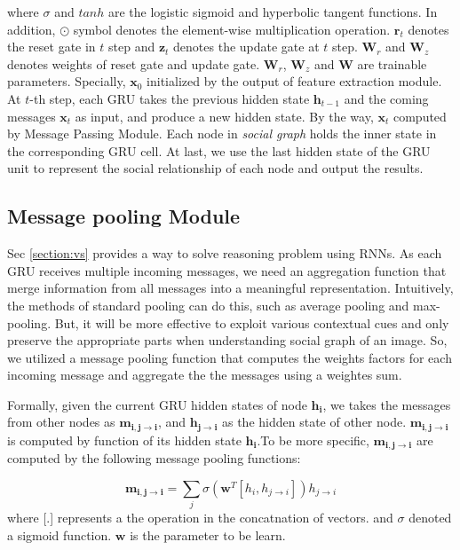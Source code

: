 \documentclass{article}
\begin{document}
where $\sigma$ and $tanh$ are the logistic sigmoid and hyperbolic tangent functions. In addition, $\odot$ symbol denotes the element-wise multiplication operation. $\bm{r}_t$ denotes the reset gate in $t$ step and $\bm{z}_t$ denotes the update gate at $t$ step. $\bm{W}_r$ and $\bm{W}_z$ denotes weights of reset gate and update gate. $\bm{W}_r$, $\bm{W}_z$ and $\bm{W}$ are trainable parameters. Specially, $\bm{x}_0$ initialized by the output of feature extraction module. At $t$-th step, each GRU takes the previous hidden state $\bm{h}_{t-1}$ and the coming messages $\bm{x}_{t}$ as input, and produce a new hidden state. By the way, $\bm{x}_t$ computed by Message Passing Module. Each node in \emph{social graph} holds the inner state in the corresponding GRU cell. At last, we use the last hidden state of the GRU unit to represent the social relationship of each node and output the results.

\subsection{Message pooling Module} \label{section:mp}

Sec \ref{section:vs} provides a way to solve reasoning problem using RNNs. As each GRU receives multiple incoming messages, we need an aggregation function that merge information from all messages into a meaningful representation. Intuitively, the methods of standard pooling  can do this, such as average pooling and max-pooling. But, it will be more effective to exploit various contextual cues and only preserve the appropriate parts when understanding social graph of an image. So, we utilized a message pooling function that computes the weights factors for each incoming message and aggregate the the messages using a weightes sum. 

Formally, given the current GRU hidden states of node $\bm{h_i}$, we takes the messages from other nodes as $\bm{m_{i,j \to i}}$, and $\bm{h_{j \to i}}$ as the hidden state of other node. $\bm{m_{i,j \to i}}$ is computed by function of its hidden state $\bm{h_i}$.To be more specific, $\bm{m_{i, j \to i}}$ are computed by the following message pooling functions:

\begin{equation}
	\bm{m_{i,j \to i}} = \sum_{j} \sigma{(\bm{w}^T[h_i,h_{j \to i}])h_{j \to i}}	
\end{equation}
where [.] represents a the operation in the concatnation of vectors. and $\sigma$ denoted a sigmoid function. $\bm{w}$ is the parameter to be learn. 
\end{document}
